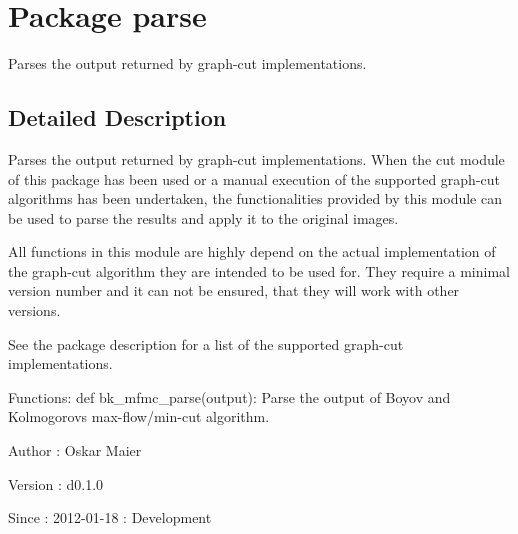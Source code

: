 \hypertarget{namespaceparse}{
\section{Package parse}
\label{namespaceparse}
}


Parses the output returned by graph-\/cut implementations.  




\subsection{Detailed Description}
Parses the output returned by graph-\/cut implementations. When the cut module of this package has been used or a manual execution of the supported graph-\/cut algorithms has been undertaken, the functionalities provided by this module can be used to parse the results and apply it to the original images.

All functions in this module are highly depend on the actual implementation of the graph-\/cut algorithm they are intended to be used for. They require a minimal version number and it can not be ensured, that they will work with other versions.

See the package description for a list of the supported graph-\/cut implementations.

Functions: def bk\_\-mfmc\_\-parse(output): Parse the output of Boyov and Kolmogorovs max-\/flow/min-\/cut algorithm.

\begin{DoxyAuthor}{Author}
: Oskar Maier 
\end{DoxyAuthor}
\begin{DoxyVersion}{Version}
: d0.1.0 
\end{DoxyVersion}
\begin{DoxySince}{Since}
: 2012-\/01-\/18 : Development 
\end{DoxySince}
